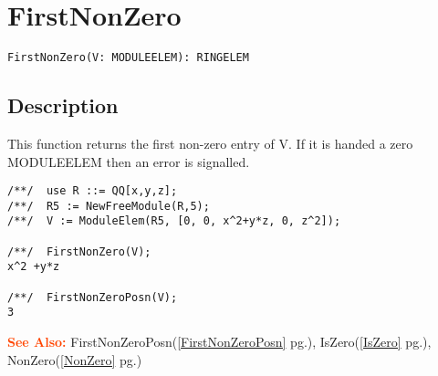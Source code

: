 \documentclass[a4paper]{mybook}
\newenvironment{command}{}{} %
\newcommand\SeeAlso{\par\textcolor{OrangeRed}{\textbf{\large See Also: }}}
\begin{document}
\section{FirstNonZero}
\label{FirstNonZero}
\begin{command} %


\begin{Verbatim}[label=syntax, rulecolor=\color{MidnightBlue},
frame=single]
FirstNonZero(V: MODULEELEM): RINGELEM
\end{Verbatim}


\subsection*{Description}

This function returns the first non-zero entry of V.  If it
is handed a zero MODULEELEM then an error is signalled.
\begin{Verbatim}[label=example, rulecolor=\color{PineGreen}, frame=single]
/**/  use R ::= QQ[x,y,z];
/**/  R5 := NewFreeModule(R,5);
/**/  V := ModuleElem(R5, [0, 0, x^2+y*z, 0, z^2]);

/**/  FirstNonZero(V);
x^2 +y*z

/**/  FirstNonZeroPosn(V);
3
\end{Verbatim}


\SeeAlso %
  FirstNonZeroPosn(\ref{FirstNonZeroPosn} pg.\pageref{FirstNonZeroPosn}), 
    IsZero(\ref{IsZero} pg.\pageref{IsZero}), 
    NonZero(\ref{NonZero} pg.\pageref{NonZero})
\end{command} %
\end{document}
